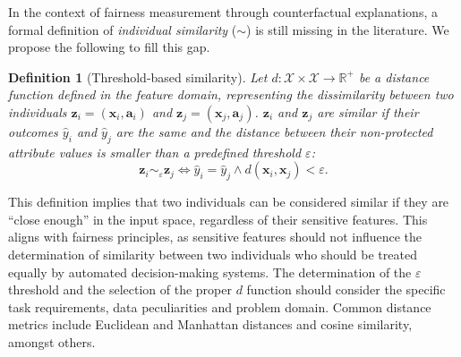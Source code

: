 \documentclass[letterpaper]{article} %
\newtheorem{definition}{Definition}
\begin{document}
In the context of fairness measurement through counterfactual explanations, a formal definition of \emph{individual similarity} ($\sim$) is still missing in the literature. We propose the following to fill this gap.
%
\begin{definition}[Threshold-based similarity]\label{similar_individuals}
	Let $d: \mathcal{X} \times \mathcal{X} \rightarrow \mathbb{R}^{+}$ be a distance function defined in the feature domain, representing the dissimilarity between two individuals $\boldsymbol{z}_i = (\boldsymbol{x}_i, \boldsymbol{a}_i)$ and $\boldsymbol{z}_j = (\boldsymbol{x}_j, \boldsymbol{a}_j)$.
	$\boldsymbol{z}_i$ and $\boldsymbol{z}_j$ are similar if their outcomes $\hat{y}_i$ and $\hat{y}_j$ are the same and the distance between their non-protected attribute values is smaller than a predefined threshold $\varepsilon$:
	$$ \boldsymbol{z}_i \sim_\varepsilon \boldsymbol{z}_j \iff \hat{y}_i = \hat{y}_j \wedge d(\boldsymbol{x}_i, \boldsymbol{x}_j) < \varepsilon. $$
\end{definition}
%
\noindent This definition implies that two individuals can be considered similar if they are ``close enough'' in the input space, regardless of their sensitive features. This aligns with fairness principles, as sensitive features should not influence the determination of similarity between two individuals who should be treated equally by automated decision-making systems.
%
The determination of the $\varepsilon$ threshold and the selection of the proper $d$ function should consider the specific task requirements, data peculiarities and problem domain. Common distance metrics include Euclidean and Manhattan distances and cosine similarity, amongst others.
\end{document}
